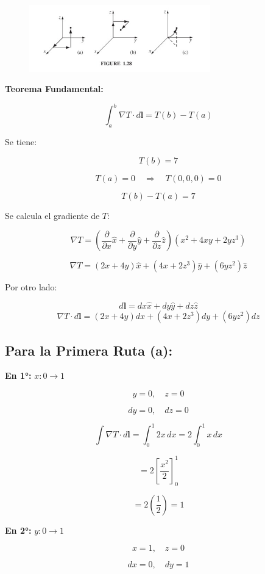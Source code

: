 \documentclass[12pt]{article}
\begin{document}
\begin{figure}[h] 
    \centering
    \includegraphics[width=0.7\textwidth]{imagenes/punto_28.jpg} 
    \label{fig:mi_figura}
\end{figure}


\textbf{Teorema Fundamental:}

\[
\int_a^b \nabla T \cdot d\mathbf{l} = T(b) - T(a)
\]

Se tiene:

\[
T(b) = 7
\]

\[
T(a) = 0 \quad \Rightarrow \quad T(0,0,0) = 0
\]

\[
\boxed{T(b) - T(a) = 7}
\]

Se calcula el gradiente de \( T \):

\[
\nabla T = \left( \frac{\partial}{\partial x} \hat{x} + \frac{\partial}{\partial y} \hat{y} + \frac{\partial}{\partial z} \hat{z} \right) (x^2 + 4xy + 2y z^3)
\]

\[
\nabla T = (2x + 4y) \hat{x} + (4x + 2z^3) \hat{y} + (6y z^2) \hat{z}
\]

Por otro lado:

\[
d\mathbf{l} = dx \hat{x} + dy \hat{y} + dz \hat{z}
\]
\[
\nabla T \cdot d\mathbf{l} = (2x + 4y)dx + (4x + 2z^3)dy + (6y z^2)dz
\]

\subsection*{Para la Primera Ruta (a):}

\textbf{En 1°:} \( x: 0 \to 1 \)

\[
y = 0, \quad z = 0
\]

\[
dy = 0, \quad dz = 0
\]

\[
\int \nabla T \cdot d\mathbf{l} = \int_0^1 2x \, dx = 2 \int_0^1 x \, dx
\]

\[
= 2 \left[ \frac{x^2}{2} \right]_0^1
\]

\[
= 2 \left( \frac{1}{2} \right) = 1
\]

\textbf{En 2°:} \( y: 0 \to 1 \)

\[
x = 1, \quad z = 0
\]

\[
dx = 0, \quad dy = 1
\]
\end{document}
